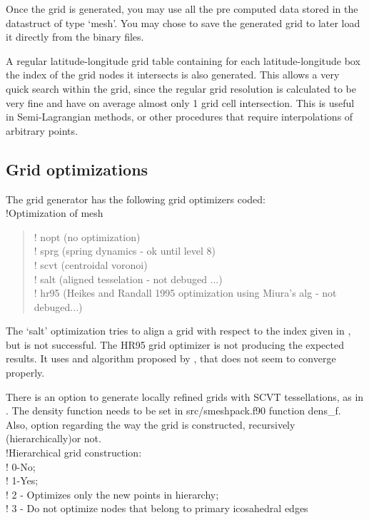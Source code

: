 \documentclass[a4paper,10pt]{article}
\begin{document}
Once the grid is generated, you may use all the pre computed data stored in the datastruct of type `mesh'. You may chose to save the generated grid to later load it directly from the binary files.

A regular latitude-longitude grid table containing for each latitude-longitude box the index of the grid nodes it intersects is also generated. This allows a very quick search within the grid, since the regular grid resolution is calculated to be very fine and have on average almost only 1 grid cell intersection. This is useful in Semi-Lagrangian methods, or other procedures that require interpolations of arbitrary points. 

\subsection{Grid optimizations}

The grid generator has the following grid optimizers coded:\\
!Optimization of mesh \\
\begin{verse}
!  nopt (no optimization) \\
!  sprg (spring dynamics - ok until level 8) \\
!  scvt (centroidal voronoi) \\
!  salt (aligned tesselation - not debuged ...) \\
!  hr95 (Heikes and Randall 1995 optimization using Miura's alg - not debuged...) \\
\end{verse}

The `salt' optimization tries to align a grid with respect to the index given in \cite{Peixoto2013}, but is not successful. The HR95 grid optimizer is not producing the expected results. It uses and algorithm proposed by  \cite{Miura2005}, that does not seem to converge properly. 

There is an option to generate locally refined grids with SCVT tessellations, as in \cite{Ringler2013}. The density function needs to be set in src/smeshpack.f90 function dens\_f. Also, option regarding the way the grid is constructed, recursively (hierarchically)or not.\\

!Hierarchical grid construction: \\
!  0-No; \\
!  1-Yes; \\
!  2 - Optimizes only the new points in hierarchy; \\
!  3 - Do not optimize nodes that belong to primary icosahedral edges\\
\end{document}
